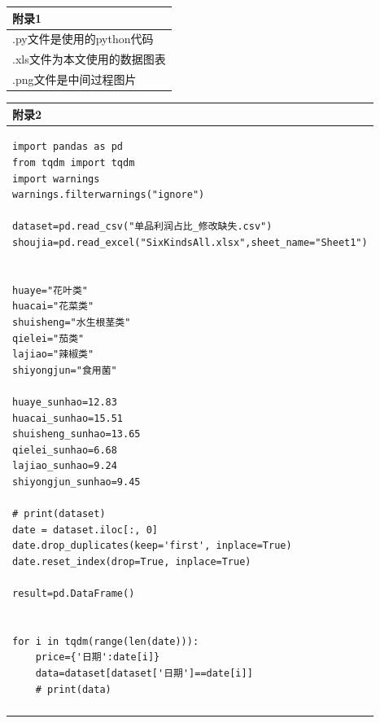 \documentclass{my_paper}
\begin{document}
\begin{table}[htbp]
    \centering
    \begin{tabular}{|p{14.0cm}|}

    \hline
    \textbf{附录1} \\ %
    \hline
    .py文件是使用的python代码 \\ 
     .xls文件为本文使用的数据图表\\
     .png文件是中间过程图片
    \hline
    \end{tabular}
\end{table}
\newpage
\begin{table}[H]
    \centering
    \begin{tabular}{|p{14.0cm}|}
    \hline
    \textbf{附录2} \\ 
    \hline
\begin{lstlisting}
import pandas as pd
from tqdm import tqdm
import warnings
warnings.filterwarnings("ignore")

dataset=pd.read_csv("单品利润占比_修改缺失.csv")
shoujia=pd.read_excel("SixKindsAll.xlsx",sheet_name="Sheet1")


huaye="花叶类"
huacai="花菜类"
shuisheng="水生根茎类"
qielei="茄类"
lajiao="辣椒类"
shiyongjun="食用菌"

huaye_sunhao=12.83
huacai_sunhao=15.51
shuisheng_sunhao=13.65
qielei_sunhao=6.68
lajiao_sunhao=9.24
shiyongjun_sunhao=9.45

# print(dataset)
date = dataset.iloc[:, 0]
date.drop_duplicates(keep='first', inplace=True)
date.reset_index(drop=True, inplace=True)

result=pd.DataFrame()


for i in tqdm(range(len(date))):
    price={'日期':date[i]}
    data=dataset[dataset['日期']==date[i]]
    # print(data)

\end{lstlisting}
    \\
    \\
\hline
    \end{tabular}
\end{table}
\newpage
\end{document}
